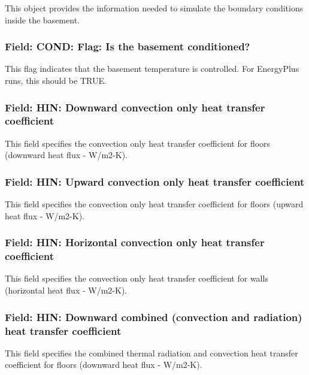 This object provides the information needed to simulate the boundary conditions inside the basement.

\subsubsection{Field: COND: Flag: Is the basement conditioned?}\label{field-cond-flag-is-the-basement-conditioned}

This flag indicates that the basement temperature is controlled. For EnergyPlus runs, this should be TRUE.

\subsubsection{Field: HIN: Downward convection only heat transfer coefficient}\label{field-hin-downward-convection-only-heat-transfer-coefficient}

This field specifies the convection only heat transfer coefficient for floors (downward heat flux - W/m2-K).

\subsubsection{Field: HIN: Upward convection only heat transfer coefficient}\label{field-hin-upward-convection-only-heat-transfer-coefficient}

This field specifies the convection only heat transfer coefficient for floors (upward heat flux - W/m2-K).

\subsubsection{Field: HIN: Horizontal convection only heat transfer coefficient}\label{field-hin-horizontal-convection-only-heat-transfer-coefficient}

This field specifies the convection only heat transfer coefficient for walls (horizontal heat flux - W/m2-K).

\subsubsection{Field: HIN: Downward combined (convection and radiation) heat transfer coefficient}\label{field-hin-downward-combined-convection-and-radiation-heat-transfer-coefficient}

This field specifies the combined thermal radiation and convection heat transfer coefficient for floors (downward heat flux - W/m2-K).

